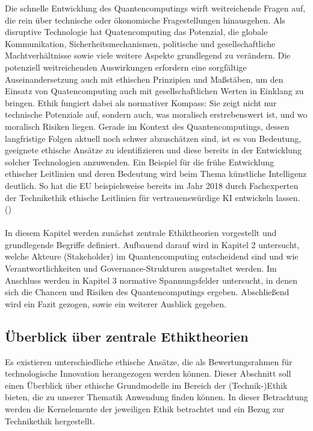 Die schnelle Entwicklung des Quantencomputings wirft weitreichende Fragen auf, die rein über technische oder ökonomische Fragestellungen hinausgehen. Als disruptive Technologie hat Quatencomputing das Potenzial, die globale Kommunikation, Sicherheitsmechanismen, politische und gesellschaftliche Machtverhältnisse sowie viele weitere Aspekte grundlegend zu verändern. Die potenziell weitreichenden Auswirkungen erfordern eine sorgfältige Auseinandersetzung auch mit ethischen Prinzipien und Maßstäben, um den Einsatz von Quatencomputing auch mit gesellschaftlichen Werten in Einklang zu bringen. Ethik fungiert dabei als normativer Kompass: Sie zeigt nicht nur technische Potenziale auf, sondern auch, was moralisch erstrebenswert ist, und wo moralisch Risiken liegen. Gerade im Kontext des Quantencomputings, dessen langfristige Folgen aktuell noch schwer abzuschätzen sind, ist es von Bedeutung, geeignete ethische Ansätze zu identifizieren und diese bereits in der Entwicklung solcher Technologien anzuwenden. Ein Beispiel für die frühe Entwicklung ethischer Leitlinien und deren Bedeutung wird beim Thema künstliche Intelligenz deutlich. So hat die EU beispielsweise bereits im Jahr 2018 durch Fachexperten der Technikethik ethische Leitlinien für vertrauenswürdige KI entwickeln lassen. (\cite{european_commission_directorate_general_for_communications_networks_content_and_technology_ethik-leitlinien_2019})
\\
\\
In diesem Kapitel werden zunächst zentrale Ethiktheorien vorgestellt und grundlegende Begriffe definiert. Aufbauend darauf wird in Kapitel 2 untersucht, welche Akteure (Stakeholder) im Quantencomputing entscheidend sind und wie Verantwortlichkeiten und Governance-Strukturen ausgestaltet werden. Im Anschluss werden in Kapitel 3  normative Spannungsfelder untersucht, in denen sich die Chancen und Risiken des Quantencomputings ergeben. Abschließend wird ein Fazit gezogen, sowie ein weiterer Ausblick gegeben.

\subsection{Überblick über zentrale Ethiktheorien}

Es existieren unterschiedliche ethische Ansätze, die als Bewertungsrahmen für technologische Innovation herangezogen werden können. Dieser Abschnitt soll einen Überblick über ethische Grundmodelle im Bereich der (Technik-)Ethik bieten, die zu unserer Thematik Anwendung finden können. In dieser Betrachtung werden die Kernelemente der jeweiligen Ethik betrachtet und ein Bezug zur Technikethik hergestellt.

